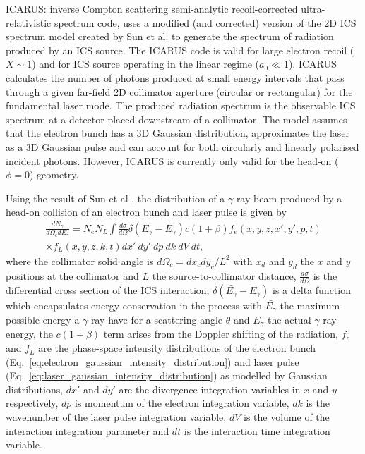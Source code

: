 \documentclass[../main.tex]{subfiles}
\begin{document}
\textsc{ICARUS}: inverse Compton scattering semi-analytic recoil-corrected ultra-relativistic spectrum code, uses a modified (and corrected) version of the 2D ICS spectrum model created by Sun et al. \cite{sun2009characterizations,sun2011theoretical} to generate the spectrum of radiation produced by an ICS source. The \textsc{ICARUS} code is valid for large electron recoil ($X\sim1$) and for ICS source operating in the linear regime ($a_{0}\ll 1$). \textsc{ICARUS} calculates the number of photons produced at small energy intervals that pass through a given far-field 2D collimator aperture (circular or rectangular) for the fundamental laser mode. The produced radiation spectrum is the observable ICS spectrum at a detector placed downstream of a collimator. The model assumes that the electron bunch has a 3D Gaussian distribution, approximates the laser as a 3D Gaussian pulse and can account for both circularly and linearly polarised incident photons. However, \textsc{ICARUS} is currently only valid for the head-on ($\phi = 0$) geometry.

Using the result of Sun et al \cite{sun2009characterizations,sun2011theoretical}, the distribution of a $\gamma$-ray beam produced by a head-on collision of an electron bunch and laser pulse is given by
\begin{multline}
\frac{dN_{\gamma}}{d\Omega_{c} dE_{\gamma}} = N_{e}N_{L}\int \frac{d\sigma}{d\Omega}\delta\left(\bar{E_{\gamma}}-E_{\gamma}\right)c\left(1+\beta\right)f_{e}\left(x,y,z,x',y',p,t\right)\\ \times f_L\left(x,y,z,k,t\right)dx'~dy'~dp~dk~dV~dt,
\label{eq:central_distribution_sun}
\end{multline}
where the collimator solid angle is $d\Omega_{c} = dx_{c}dy_{c}/L^{2}$ with $x_{d}$ and $y_{d}$ the $x$ and $y$ positions at the collimator and $L$ the source-to-collimator distance, $\frac{d\sigma}{d\Omega}$ is the differential cross section of the ICS interaction, $\delta\left(\bar{E_{\gamma}}-E_{\gamma}\right)$ is a delta function which encapsulates energy conservation in the process with $\bar{E_{\gamma}}$ the maximum possible energy a $\gamma$-ray have for a scattering angle $\theta$ and $E_{\gamma}$ the actual $\gamma$-ray energy, the $c\left(1+\beta\right)$ term arises from the Doppler shifting of the radiation, $f_{e}$ and $f_{L}$ are the phase-space intensity distributions of the electron bunch (Eq.~\ref{eq:electron_gaussian_intensity_distribution}) and laser pulse (Eq.~\ref{eq:laser_gaussian_intensity_distribution}) as modelled by Gaussian distributions, $dx'$ and $dy'$ are the divergence integration variables in $x$ and $y$ respectively, $dp$ is momentum of the electron integration variable, $dk$ is the wavenumber of the laser pulse integration variable, $dV$ is the volume of the interaction integration parameter and  $dt$ is the interaction time integration variable. 
\end{document}
